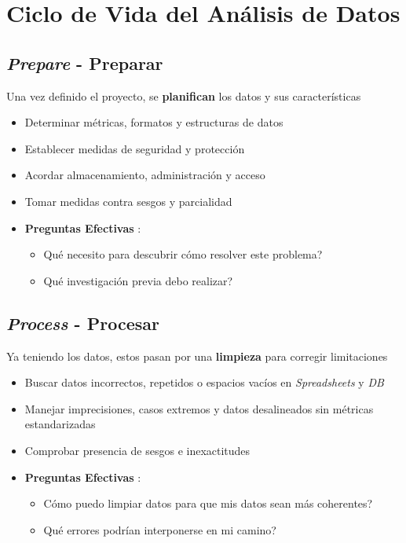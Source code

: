 \section{Ciclo de Vida del Análisis de Datos}



\subsection{\textit{Prepare} - Preparar}
Una vez definido el proyecto, se \textbf{planifican} los datos y sus características
\begin{itemize}
   \item {Determinar métricas, formatos y estructuras de datos}
   \item {Establecer medidas de seguridad y protección}
   \item {Acordar almacenamiento, administración y acceso}
   \item {Tomar medidas contra sesgos y parcialidad}
    \item {\textbf{Preguntas Efectivas} :
    \begin{itemize}
        \item {Qué necesito para descubrir cómo resolver este problema?}
        \item {Qué investigación previa debo realizar?}
    \end{itemize}}
\end{itemize}

\subsection{\textit{Process} - Procesar}
Ya teniendo los datos, estos pasan por una \textbf{limpieza} para corregir limitaciones
\begin{itemize}
    \item {Buscar datos incorrectos, repetidos o espacios vacíos en \textit{Spreadsheets} y \textit{DB}}
    \item {Manejar imprecisiones, casos extremos y datos desalineados sin métricas estandarizadas}
    \item {Comprobar presencia de sesgos e inexactitudes}
    \item {\textbf{Preguntas Efectivas} :
    \begin{itemize}
        \item {Cómo puedo limpiar datos para que mis datos sean más coherentes?}
        \item {Qué errores podrían interponerse en mi camino?}
    \end{itemize}}
\end{itemize}

